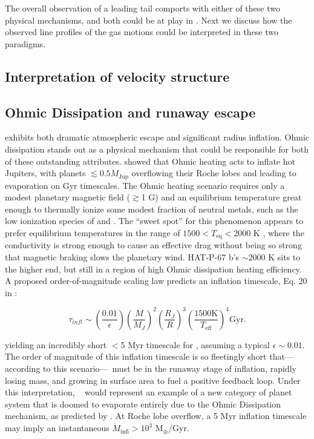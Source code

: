 \documentclass[twocolumn]{aastex631}
\newcommand{\hatpb}{\object{HAT-P-67 b}}
\begin{document}
The overall observation of a leading tail comports with either of these two physical mechanisms, and both could be at play in \hatpb.  Next we discuss how the observed line profiles of the gas motions could be interpreted in these two paradigms.

\subsection{Interpretation of velocity structure}

\subsection{Ohmic Dissipation and runaway escape}
 exhibits both dramatic atmospheric escape and significant radius inflation.  Ohmic dissipation stands out as a physical mechanism that could be responsible for both of these outstanding attributes.  \citet{2011ApJ...738....1B} showed that Ohmic heating acts to inflate hot Jupiters, with planets $\lesssim 0.5 M_\mathrm{Jup}$ overflowing their Roche lobes and leading to evaporation on Gyr timescales.  The Ohmic heating scenario requires only a modest planetary magnetic field ($\gtrsim$1 G) and an equilibrium temperature great enough to thermally ionize some modest fraction of neutral metals, such as the low ionization species of  and .  The ``sweet spot'' for this phenomenon appears to prefer equilibrium temperatures in the range of $1500<T_\mathrm{eq}<2000$ K \citep{2011ApJ...738....1B,2012ApJ...745..138M,2016ApJ...819..116G,2018AJ....155..214T,2022A&A...658L...7K}, where the conductivity is strong enough to cause an effective drag without being so strong that magnetic braking slows the planetary wind.  HAT-P-67 b's $\sim$2000 K sits to the higher end, but still in a region of high Ohmic dissipation heating efficiency.  A proposed order-of-magnitude scaling law predicts an inflation timescale, Eq. 20 in \citet{2011ApJ...738....1B}:

\begin{equation}
    \tau_{\textit{infl}}\sim \left(\frac{0.01}{\epsilon} \right) \left(\frac{M}{M_{J}}\right)^2 \left(\frac{R_{J}}{R}\right)^3 \left(\frac{1500 \textrm{K}}{T_\mathrm{eff}}\right)^4 \textrm{Gyr}. \label{eqInflate}
\end{equation}


\noindent yielding an incredibly short $<$5 Myr timescale for \hatpb, assuming a typical $\epsilon\sim0.01$.  The order of magnitude of this inflation timescale is so fleetingly short that---according to this scenario---\hatpb~must be in the runaway stage of inflation, rapidly losing mass, and growing in surface area to fuel a positive feedback loop.  Under this interpretation, \hatpb~ would represent an example of a new category of planet system that is doomed to evaporate entirely due to the Ohmic Dissipation mechanism, as predicted by \citet{2011ApJ...738....1B}.  At Roche lobe overflow, a 5 Myr inflation timescale may imply an instantaneous $\dot{M}_\mathrm{infl}>10^{3}$ M$_\oplus$/Gyr.
\end{document}

